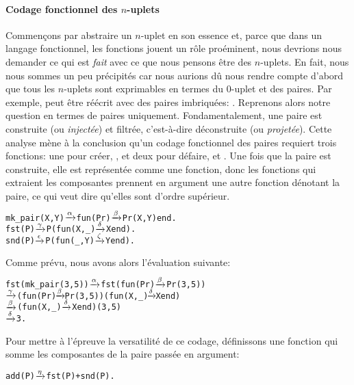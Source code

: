 \paragraph{Codage fonctionnel des \(n\)-uplets}

Commençons par abstraire un \(n\)-uplet en son essence et, parce que
dans un langage fonctionnel, les fonctions jouent un rôle proéminent,
nous devrions nous demander ce qui est \emph{fait} avec ce que nous
pensons être des \(n\)-uplets. En fait, nous nous sommes un peu
précipités car nous aurions dû nous rendre compte d'abord que tous les
\(n\)-uplets sont exprimables en termes du \(0\)-uplet et des
paires. Par exemple,  peut
être réécrit avec des paires imbriquées: . Reprenons alors notre question en termes de
paires uniquement. Fondamentalement, une paire est construite (ou
\emph{injectée}) et filtrée, c'est-à-dire déconstruite (ou
\emph{projetée}). Cette analyse mène à la conclusion qu'un codage
fonctionnel des paires requiert trois fonctions: une pour créer,
, et deux pour défaire,  et
. Une fois que la paire est construite, elle est
représentée comme une fonction, donc les fonctions qui extraient les
composantes prennent en argument une autre fonction dénotant la paire,
ce qui veut dire qu'elles sont d'ordre supérieur.
\begin{alltt}
mk\_pair(X,Y) \(\smashedrightarrow{\alpha}\) fun(Pr) \(\smashedrightarrow{\beta}\) Pr(X,Y) end.\hfill% \emph{Projection} Pr
fst(P) \(\smashedrightarrow{\gamma}\) P(fun(X,\_) \(\smashedrightarrow{\delta}\) X end).\hfill% P \emph{dénote une paire}
snd(P) \(\smashedrightarrow{\epsilon}\) P(fun(_,Y) \(\smashedrightarrow{\zeta}\) Y end).
\end{alltt}
Comme prévu, nous avons alors l'évaluation suivante:
\begin{alltt}
fst(mk\_pair(3,5)) \(\smashedrightarrow{\alpha}\) fst(fun(Pr) \(\smashedrightarrow{\beta}\) Pr(3,5))
                  \(\smashedrightarrow{\gamma}\) (fun(Pr) \(\!\smashedrightarrow{\beta}\!\) Pr(3,5))(fun(X,\_) \(\!\smashedrightarrow{\delta}\!\) X end)
                  \(\smashedrightarrow{\beta}\) (fun(X,\_) \(\smashedrightarrow{\delta}\) X end)(3,5)
                  \(\smashedrightarrow{\delta}\) 3.
\end{alltt}
Pour mettre à l'épreuve la versatilité de ce codage, définissons une
fonction  qui somme les composantes de la paire passée
en argument:
\begin{alltt}
add(P) \(\smashedrightarrow{\eta}\) fst(P) + snd(P).
\end{alltt}
